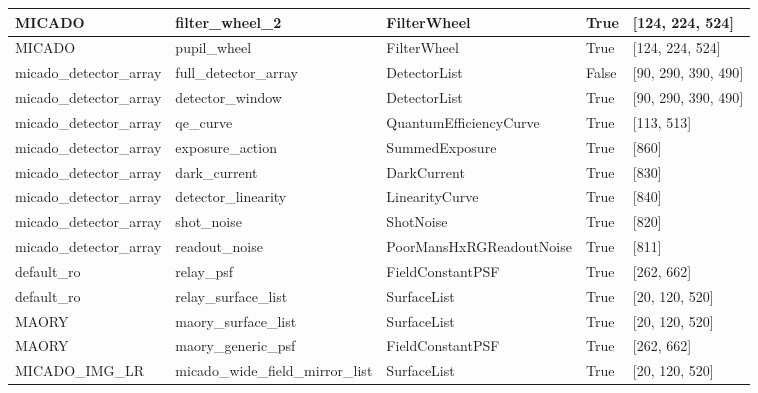 \begin{longtable*}[c]{|p{0.181\DUtablewidth}|p{0.270\DUtablewidth}|p{0.262\DUtablewidth}|p{0.077\DUtablewidth}|p{0.165\DUtablewidth}|}
MICADO
 & 
filter\_wheel\_2
 & 
FilterWheel
 & 
True
 & 
{[}124, 224, 524{]}
 \\
\hline

MICADO
 & 
pupil\_wheel
 & 
FilterWheel
 & 
True
 & 
{[}124, 224, 524{]}
 \\
\hline

micado\_detector\_array
 & 
full\_detector\_array
 & 
DetectorList
 & 
False
 & 
{[}90, 290, 390, 490{]}
 \\
\hline

micado\_detector\_array
 & 
detector\_window
 & 
DetectorList
 & 
True
 & 
{[}90, 290, 390, 490{]}
 \\
\hline

micado\_detector\_array
 & 
qe\_curve
 & 
QuantumEfficiencyCurve
 & 
True
 & 
{[}113, 513{]}
 \\
\hline

micado\_detector\_array
 & 
exposure\_action
 & 
SummedExposure
 & 
True
 & 
{[}860{]}
 \\
\hline

micado\_detector\_array
 & 
dark\_current
 & 
DarkCurrent
 & 
True
 & 
{[}830{]}
 \\
\hline

micado\_detector\_array
 & 
detector\_linearity
 & 
LinearityCurve
 & 
True
 & 
{[}840{]}
 \\
\hline

micado\_detector\_array
 & 
shot\_noise
 & 
ShotNoise
 & 
True
 & 
{[}820{]}
 \\
\hline

micado\_detector\_array
 & 
readout\_noise
 & 
PoorMansHxRGReadoutNoise
 & 
True
 & 
{[}811{]}
 \\
\hline

default\_ro
 & 
relay\_psf
 & 
FieldConstantPSF
 & 
True
 & 
{[}262, 662{]}
 \\
\hline

default\_ro
 & 
relay\_surface\_list
 & 
SurfaceList
 & 
True
 & 
{[}20, 120, 520{]}
 \\
\hline

MAORY
 & 
maory\_surface\_list
 & 
SurfaceList
 & 
True
 & 
{[}20, 120, 520{]}
 \\
\hline

MAORY
 & 
maory\_generic\_psf
 & 
FieldConstantPSF
 & 
True
 & 
{[}262, 662{]}
 \\
\hline

MICADO\_IMG\_LR
 & 
micado\_wide\_field\_mirror\_list
 & 
SurfaceList
 & 
True
 & 
{[}20, 120, 520{]}
 \\
\hline


\end{longtable*}
